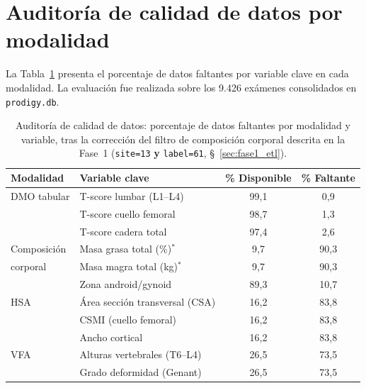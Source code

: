 \documentclass[../tesis.tex]{subfiles}
\begin{document}

\section{Auditoría de calidad de datos por modalidad}
\label{sec:resultados_calidad}

La Tabla~\ref{tab:calidad} presenta el porcentaje de datos faltantes por variable clave en cada modalidad. La evaluación fue realizada sobre los 9.426 exámenes consolidados en \texttt{prodigy.db}.

\begin{table}[h]
\centering
\caption[Auditoría de calidad de datos por modalidad y variable]{Auditoría de calidad de datos: porcentaje de datos faltantes por modalidad y variable, tras la corrección del filtro de composición corporal descrita en la Fase~1 (\texttt{site=13} \textbf{y} \texttt{label=61}, §~\ref{sec:fase1_etl}).}
\label{tab:calidad}
\begin{tabular}{llcc}
\toprule
\textbf{Modalidad} & \textbf{Variable clave} & \textbf{\% Disponible} & \textbf{\% Faltante} \\
\midrule
DMO tabular & T-score lumbar (L1--L4)    & 99{,}1 & 0{,}9 \\
            & T-score cuello femoral      & 98{,}7 & 1{,}3 \\
            & T-score cadera total        & 97{,}4 & 2{,}6 \\
\midrule
Composición & Masa grasa total (\%)$^{*}$       & 9{,}7 & 90{,}3 \\
corporal    & Masa magra total (kg)$^{*}$        & 9{,}7 & 90{,}3 \\
            & Zona android/gynoid         & 89{,}3 & 10{,}7 \\
\midrule
HSA         & Área sección transversal (CSA) & 16{,}2 & 83{,}8 \\
            & CSMI (cuello femoral)           & 16{,}2 & 83{,}8 \\
            & Ancho cortical                  & 16{,}2 & 83{,}8 \\
\midrule
VFA         & Alturas vertebrales (T6--L4)   & 26{,}5 & 73{,}5 \\
            & Grado deformidad (Genant)       & 26{,}5 & 73{,}5 \\
\bottomrule
\end{tabular}
\end{table}
\end{document}
